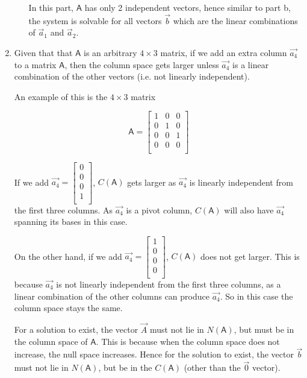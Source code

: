 \documentclass[a4paper, 11pt]{article}
\newcommand{\mat}[1]{\boldsymbol { \mathsf{#1}} }
\begin{document}
\begin{enumerate}
\begin{enumerate}
In this part, $\mat A$ has only 2 independent vectors, hence similar to part b, the system is solvable for all vectors $\vec b$ which are the linear combinations of $\vec a_1$ and $\vec a_2$.

\end{enumerate}

\item Given that that $\mat{A}$ is an arbitrary $4 \times 3$ matrix, if we add an extra column $\vec{a_4}$ to a matrix $\mat{A}$, then the column space gets larger unless $\vec{a_4}$ is a linear combination of the other vectors (i.e. not linearly independent).

An example of this is the $4 \times 3$ matrix

\begin{equation*}
\mat{A} = 
	\begin{bmatrix}
	1 & 0 & 0 \\
	0 & 1 & 0 \\
	0 & 0 & 1 \\
	0 & 0 & 0 \\
	\end{bmatrix}
\end{equation*}

If we add $\vec{a_4} = \begin{bmatrix}
0 \\
0 \\
0 \\
1 \\
\end{bmatrix}$, $C(\mat{A})$ gets larger as $\vec{a_4}$ is linearly independent from the first three columns. As $\vec{a_4}$ is a pivot column, $C(\mat{A})$ will also have $\vec{a_4}$ spanning its bases in this case.

On the other hand, if we add $\vec{a_4} = \begin{bmatrix}
1 \\
0 \\
0 \\
0 \\
\end{bmatrix}$, $C(\mat{A})$ does not get larger. This is because $\vec{a_4}$ is not linearly independent from the first three columns, as a linear combination of the other columns can produce $\vec{a_4}$. So in this case the column space stays the same.

For a solution to exist, the vector $\vec{A}$ must not lie in $N(\mat{A})$, but must be in the column space of $\mat{A}$. This is because when the column space does not increase, the null space increases. Hence for the solution to exist, the vector $\vec{b}$ must not lie in $N(\mat{A})$, but be in the $C(\mat{A})$ (other than the $\vec{0}$ vector).


\end{enumerate}
\end{document}
